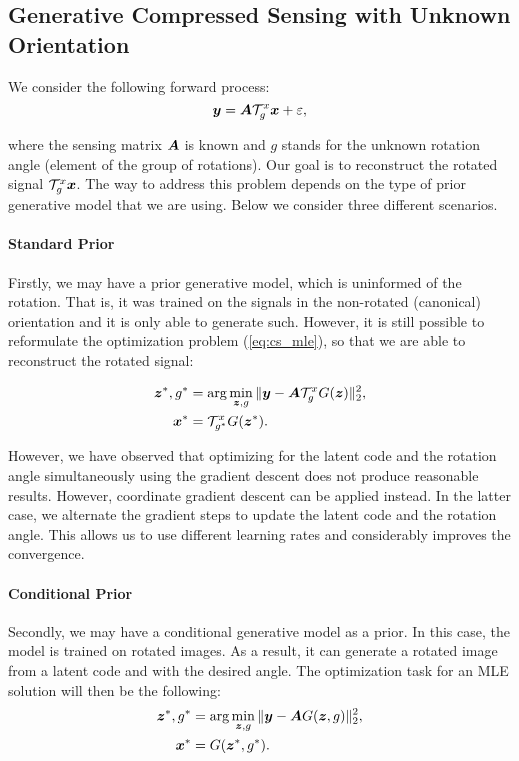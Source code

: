 \subsection{Generative Compressed Sensing with Unknown Orientation} \label{sec:gen_cs_rotation}

We consider the following forward process:
\begin{equation}
    {\bm{y}} = {\bm{A}} {\mathcal{T}}_g^x {\bm{x}} + \varepsilon,
\end{equation}

where the sensing matrix ${\bm{A}}$ is known and $g$ stands for the unknown rotation angle (element of the group of rotations). 
Our goal is to reconstruct the rotated signal ${\mathcal{T}}_g^x {\bm{x}}$. The way to address this problem depends on the type of prior generative model that we are using. Below we consider three different scenarios. 

\paragraph{Standard Prior}
Firstly, we may have a prior generative model, which is uninformed of the rotation. That is, it was trained on the signals in the non-rotated (canonical) orientation and it is only able to generate such. However, it is still possible to reformulate the optimization problem (\ref{eq:cs_mle}), so that we are able to reconstruct the rotated signal:

\begin{align}
    {\bm{z}}^*, g^* &= \arg\min_{{\bm{z}}, g} \|{\bm{y}} - {\bm{A}} {\mathcal{T}}_{g}^x G({\bm{z}})\|_2^2, \\
    {\bm{x}}^* &= {\mathcal{T}}_{g^*}^x G({\bm{z}}^*).
\end{align}

However, we have observed that optimizing for the latent code and the rotation angle simultaneously using the gradient descent does not produce reasonable results. However, coordinate gradient descent can be applied instead. In the latter case, we alternate the gradient steps to update the latent code and the rotation angle. This allows us to use different learning rates and considerably improves the convergence. 

\paragraph{Conditional Prior}
Secondly, we may have a conditional generative model as a prior. In this case, the model is trained on rotated images. As a result, it can generate a rotated image from a latent code and with the desired angle. The optimization task for an MLE solution will then be the following:
\begin{align}
    {\bm{z}}^*, g^* &= \arg\min_{{\bm{z}}, g} \|{\bm{y}} - {\bm{A}} G({\bm{z}}, g)\|_2^2, \\
    {\bm{x}}^{*} &= G({\bm{z}}^*, g^*).
\end{align}


